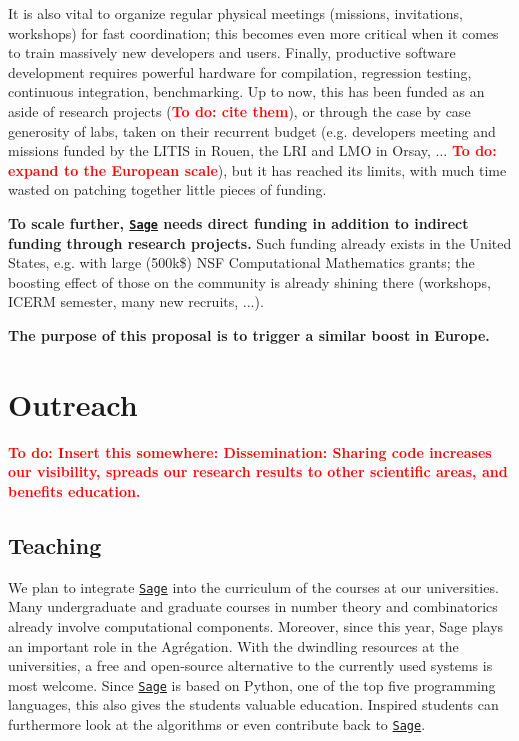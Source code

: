 \documentclass[a4,12pt]{amsart}
\newcommand{\sage}{\href{http://www.sagemath.org/}{\texttt{Sage}}\xspace}
\newcommand{\TODO}[2][To do: ]{{\textcolor{red}{\textbf{#1#2}}}}
\begin{document}
It is also vital to organize regular physical meetings (missions,
invitations, workshops) for fast coordination; this becomes even more
critical when it comes to train massively new developers and users.
Finally, productive software development requires powerful hardware for
compilation, regression testing, continuous integration,
benchmarking.
%
Up to now, this has been funded as an aside of research
projects (\TODO{cite them}), or through the case by case generosity of
labs, taken on their recurrent budget (e.g. developers meeting and
missions funded by the LITIS in Rouen, the LRI and LMO in Orsay,
... \TODO{expand to the European scale}), but it has reached its
limits, with much time wasted on patching together little pieces of
funding.
%



\textbf{To scale further, \sage needs direct funding in addition to
  indirect funding through research projects.} Such funding already
exists in the United States, e.g. with large (500k\$) NSF
Computational Mathematics grants; the boosting effect of those on the
community is already shining there (workshops, ICERM semester, many
new recruits, ...).

\medskip
\textbf{The purpose of this proposal is to trigger a similar boost in
  Europe.}

\section{Outreach}

\TODO{Insert this somewhere: Dissemination: Sharing code increases our
  visibility, spreads our research results to other scientific areas,
  and benefits education.}

\subsection{Teaching}

We plan to integrate \sage into the curriculum of the courses at our
universities. Many undergraduate and graduate courses in number theory
and combinatorics already involve computational components. Moreover,
since this year, Sage plays an important role in the Agrégation. With
the dwindling resources at the universities, a free and open-source
alternative to the currently used systems %
is most welcome. Since \sage is based on Python, one of the top five
programming languages, this also gives the students valuable
education.  Inspired students can furthermore look at the algorithms
or even contribute back to \sage.
\end{document}

